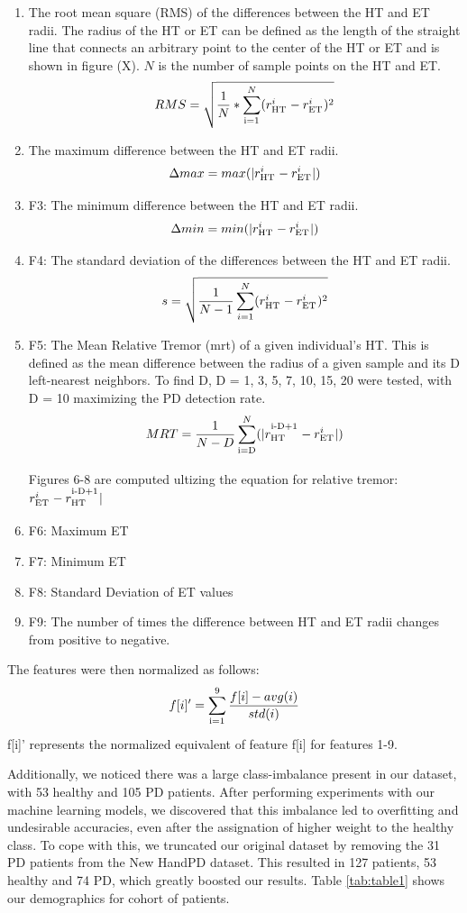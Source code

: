 \documentclass[pmlr,twocolumn,10pt]{jmlr} %
\let\SUP\textsuperscript
\begin{document}
\begin{enumerate}
\item The root mean square (RMS) of the differences between the HT and ET radii. The radius of the HT or ET can be defined as the length of the straight line that connects an arbitrary point to the center of the HT or ET and is shown in figure (X). $N$ is the number of sample points on the HT and ET.
\[RMS = \sqrt{\frac{1}{N} * \sum_\SUP{i=1}^N(r_\SUP{HT}^i - r_\SUP{ET}^i)^2}\]

\item The maximum difference between the HT and ET radii. 
\[\Delta max = max(|r_\SUP{HT}^i - r_\SUP{ET}^i|)\]

\item F3: The minimum difference between the HT and ET radii. 
\[\Delta min = min(|r_\SUP{HT}^i - r_\SUP{ET}^i|)\]

\item F4: The standard deviation of the differences between the HT and ET radii. 
\[s = \sqrt{\frac{1}{N-1}\sum_{i=1}^N(r_\SUP{HT}^i - r_\SUP{ET}^i)^2}\]

\item F5: The Mean Relative Tremor (mrt) of a given individual’s HT. This is defined as the mean difference between the radius of a given sample and its D left-nearest neighbors. To find D, D = {1, 3, 5, 7, 10, 15, 20} were tested, with D = 10 maximizing the PD detection rate. 
\[MRT = \frac{1}{N-D}\sum_\SUP{i=D}^N(|r_\SUP{HT}^\SUP{i-D+1} - r_\SUP{ET}^i|)\]

Figures 6-8 are computed ultizing the equation for relative tremor: $r_\SUP{ET}^i - r_\SUP{HT}^\SUP{i-D+1}|$
\item F6: Maximum ET
\item F7: Minimum ET
\item F8: Standard Deviation of ET values
\item F9: The number of times the difference between HT and ET radii changes from positive to negative.
\end{enumerate}

The features were then normalized as follows:
\[f[i]' = \sum_\SUP{i=1}^9\frac{f[i] - avg(i)}{std(i)}\]
f[i]' represents the normalized equivalent of feature f[i] for features 1-9.

Additionally, we noticed there was a large class-imbalance present in our dataset, with 53 healthy and 105 PD patients. After performing experiments with our machine learning models, we discovered that this imbalance led to overfitting and undesirable accuracies, even after the assignation of higher weight to the healthy class. To cope with this, we truncated our original dataset by removing the 31 PD patients from the New HandPD dataset. This resulted in 127 patients, 53 healthy and 74 PD, which greatly boosted our results. Table \ref{tab:table1} shows our demographics for cohort of patients. 
\end{document}
